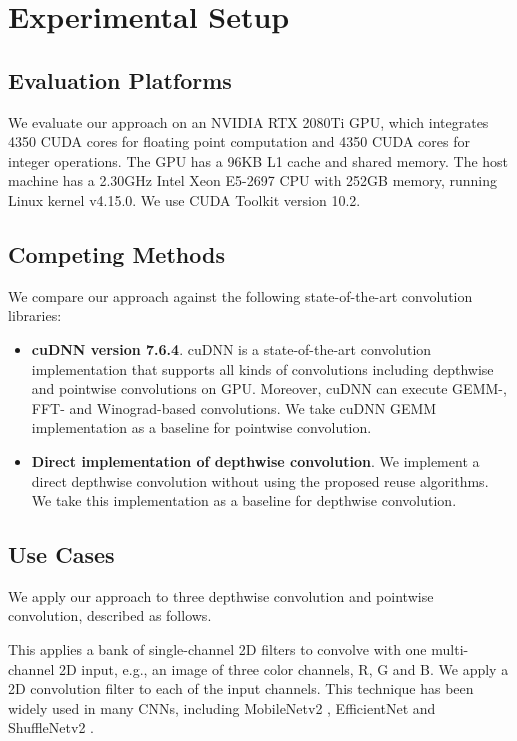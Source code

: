 

\section{Experimental Setup}

\subsection{Evaluation Platforms} We evaluate our approach on an NVIDIA RTX 2080Ti GPU, which integrates 4350 CUDA cores for floating
point computation  and 4350 CUDA cores for integer operations. The GPU has a 96KB L1 cache and shared memory. The host machine has a 2.30GHz
Intel Xeon E5-2697 CPU with 252GB memory, running Linux kernel v4.15.0. We use CUDA Toolkit version 10.2.


\subsection{Competing Methods} We compare our approach against the following state-of-the-art convolution libraries:
\begin{itemize}
  \item \textbf{cuDNN version 7.6.4}. cuDNN is a state-of-the-art convolution implementation that supports all kinds of convolutions including depthwise and pointwise convolutions on GPU. 
  Moreover, cuDNN can execute GEMM-, FFT- and Winograd-based convolutions. We take cuDNN GEMM implementation as a baseline for pointwise convolution.
  \item \textbf{Direct implementation of depthwise convolution}. We implement a direct depthwise convolution without using the proposed reuse algorithms. We take this implementation as a baseline for depthwise convolution.
\end{itemize}

\subsection{Use Cases}
We apply our approach to three depthwise convolution and pointwise convolution, described as follows.

 This applies a bank of single-channel 2D filters to convolve with one multi-channel 2D input, e.g., an image of three color channels, R, G and B. We apply a 2D convolution filter to each of the input channels. 
This technique has been widely used in many CNNs, including MobileNetv2 \cite{Sandler_2018_CVPR}, EfficientNet \cite{tan2019efficientnet} and ShuffleNetv2 \cite{Ma_2018_ECCV}.

